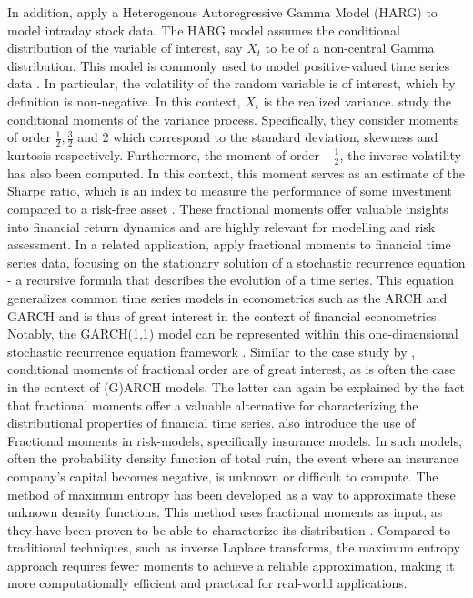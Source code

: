 \newline 
In addition, \cite{hansen2024} apply a Heterogenous Autoregressive Gamma Model (HARG) to model intraday stock data. The HARG model assumes the conditional distribution of the variable of interest, say \(X_t\) to be of a non-central Gamma distribution. This model is commonly used to model positive-valued time series data \cite{gourierroux2006}. In particular, the volatility of the random variable is of interest, which by definition is non-negative.
\newline
In this context, \(X_t\) is the realized variance. \cite{hansen2024} study the conditional moments of the variance process. Specifically, they consider moments of order \(\frac{1}{2}, \frac{3}{2}\) and 2 which correspond to the standard deviation, skewness and kurtosis respectively. Furthermore, the moment of order \(-\frac{1}{2}\), the inverse volatility has also been computed. In this context, this moment serves as an estimate of the Sharpe ratio, which is an index to measure the performance of some investment compared to a risk-free asset \cite{sharpe1994}. These fractional moments offer valuable insights into financial return dynamics and are highly relevant for modelling and risk assessment. 
\newline
In a related application, \cite{Mikosc2013} apply fractional moments to financial time series data, focusing on the stationary solution of a stochastic recurrence equation - a recursive formula that describes the evolution of a time series. This equation generalizes common time series models in econometrics such as the ARCH and GARCH and is thus of great interest in the context of financial econometrics. Notably, the GARCH(1,1) model can be represented within this one-dimensional stochastic recurrence equation framework \cite{Mikosc2013}. 
\newline
Similar to the case study by \cite{hansen2024}, conditional moments of fractional order are of great interest, as is often the case in the context of (G)ARCH models. The latter can again be explained by the fact that fractional moments offer a valuable alternative for characterizing the distributional properties of financial time series.
\newline
\cite{gyzl2013} also introduce the use of Fractional moments in risk-models, specifically insurance models. In such models, often the probability density function of total ruin, the event where an insurance company's capital becomes negative, is unknown or difficult to compute. The method of maximum entropy has been developed as a way to approximate these unknown density functions. This method uses fractional moments as input, as they have been proven to be able to characterize its distribution \cite{lin1992}. Compared to traditional techniques, such as inverse Laplace transforms, the maximum entropy approach requires fewer moments to achieve a reliable approximation, making it more computationally efficient and practical for real-world applications. 

